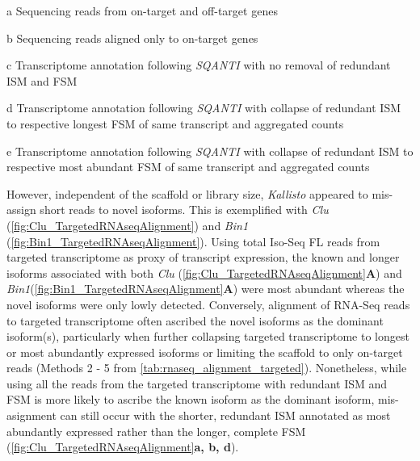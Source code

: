 \begin{table}[h]
\begin{threeparttable}
\begin{tablenotes}
			\item[a] Sequencing reads from on-target and off-target genes
			\item[b] Sequencing reads aligned only to on-target genes
			\item[c] Transcriptome annotation following \textit{SQANTI} with no removal of redundant ISM and FSM
			\item[d] Transcriptome annotation following \textit{SQANTI} with collapse of redundant ISM to respective longest FSM of same transcript and aggregated counts
			\item[e] Transcriptome annotation following \textit{SQANTI} with collapse of redundant ISM to respective most abundant FSM of same transcript and aggregated counts 
		\end{tablenotes}
	\end{threeparttable}
\end{table}

However, independent of the scaffold or library size, \textit{Kallisto} appeared to mis-assign short reads to novel isoforms. This is exemplified with \textit{Clu} (\cref{fig:Clu_TargetedRNAseqAlignment}) and \textit{Bin1} (\cref{fig:Bin1_TargetedRNAseqAlignment}).   Using total Iso-Seq FL reads from targeted transcriptome as proxy of transcript expression, the known and longer isoforms associated with both \textit{Clu} (\cref{fig:Clu_TargetedRNAseqAlignment}\textbf{A}) and \textit{Bin1}(\cref{fig:Bin1_TargetedRNAseqAlignment}\textbf{A}) were most abundant whereas the novel isoforms were only lowly detected. Conversely, alignment of RNA-Seq reads to targeted transcriptome often ascribed the novel isoforms as the dominant isoform(s), particularly when further collapsing targeted transcriptome to longest or most abundantly expressed isoforms or limiting the scaffold to only on-target reads (Methods 2 - 5 from \cref{tab:rnaseq_alignment_targeted}). Nonetheless, while using all the reads from the targeted transcriptome with redundant ISM and FSM is more likely to ascribe the known isoform as the dominant isoform, mis-asignment can still occur with the shorter, redundant ISM annotated as most abundantly expressed rather than the longer, complete FSM (\cref{fig:Clu_TargetedRNAseqAlignment}\textbf{a, b, d}).

